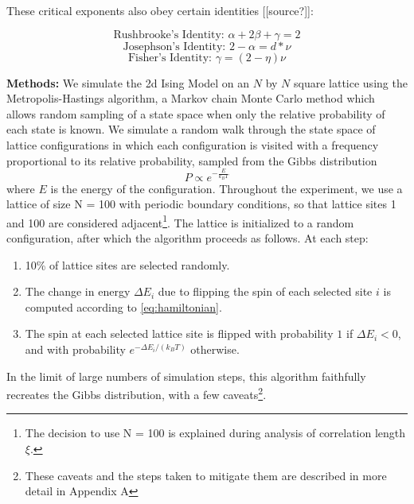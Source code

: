 \documentclass[letter,scriptaddress,twocolumn, prl,nofootinbib]{revtex4}
\begin{document}
These critical exponents also obey certain identities [[source?]]:

\begin{equation}
	\text{Rushbrooke's Identity: } \alpha + 2\beta + \gamma = 2 \label{eq:rushbrooke}
\end{equation}
\begin{equation}
	\text{Josephson's Identity: } 2 - \alpha = d * \nu \label{eq:josephson}
\end{equation}
\begin{equation}
	\text{Fisher's Identity: } \gamma = (2 - \eta)\nu \label{eq:fisher}
\end{equation}

\textbf{Methods:} We simulate the 2d Ising Model on an $N$ by $N$ square lattice using the Metropolis-Hastings algorithm, a Markov chain Monte Carlo method which allows random sampling of a state space when only the relative probability of each state is known. We simulate a random walk through the state space of lattice configurations in which each configuration is visited with a frequency proportional to its relative probability, sampled from the Gibbs distribution
\begin{equation}
	P \propto e^{-\frac{E}{k_B T}}
\end{equation}
where $E$ is the energy of the configuration. Throughout the experiment, we use a lattice of size N = 100 with periodic boundary conditions, so that lattice sites 1 and 100 are considered adjacent\footnote{The decision to use N = 100 is explained during analysis of correlation length $\xi$.}. The lattice is initialized to a random configuration, after which the algorithm proceeds as follows. At each step:
\begin{enumerate}
	\item 10\% of lattice sites are selected randomly.
	\item The change in energy $\Delta E_i$ due to flipping the spin of each selected site $i$ is computed according to \autoref{eq:hamiltonian}.
	\item The spin at each selected lattice site is flipped with probability $1$ if $\Delta E_i < 0$, and with probability $e^{-\Delta E_i/(k_BT)}$ otherwise.
\end{enumerate}

In the limit of large numbers of simulation steps, this algorithm faithfully recreates the Gibbs distribution, with a few caveats\footnote{These caveats and the steps taken to mitigate them are described in more detail in Appendix A}.
\end{document}
